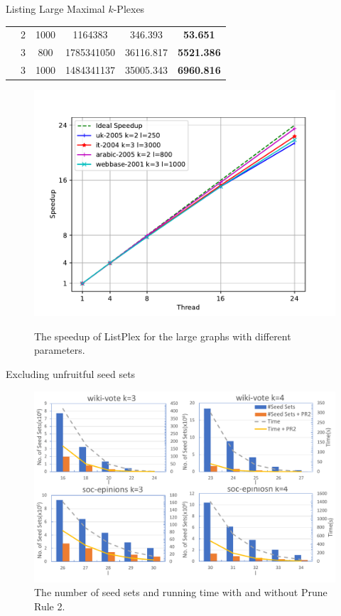 \documentclass[9pt]{beamer} %
\begin{document}
\begin{frame}{Listing Large Maximal $k$-Plexes}
\begin{minipage}{0.45\linewidth}
\begin{table}[H]
{\begin{tabular}{c|c|c|c|c|c}
            & 2 & 1000 & 1164383 & 346.393 & \textbf{53.651} \\
            \cline{2-6}
            & 3 & 800 & 1785341050 & 36116.817 &\textbf{5521.386} \\
            & 3 & 1000 & 1484341137 & 35005.343 & \textbf{6960.816} \\
            \bottomrule[2pt]
            \end{tabular}
            }
        \end{table}
    \end{minipage}\hspace{0.5cm}
    \begin{minipage}{0.45\linewidth}
        \begin{figure}[H]
            \centering
            \includegraphics[width=\linewidth]{pic/parallel.pdf}\\
            \caption{The speedup of ListPlex for the large graphs with different parameters. }
          \end{figure}
    \end{minipage}
\end{frame}
\begin{frame}{Excluding unfruitful seed sets}
    \begin{figure}[htb]
        \centering
        \includegraphics[width=0.8\linewidth]{pic/prune.pdf}
        \caption{The number of seed sets and running time with and without Prune Rule 2.}
      \end{figure} 
\end{frame}
\end{document}
